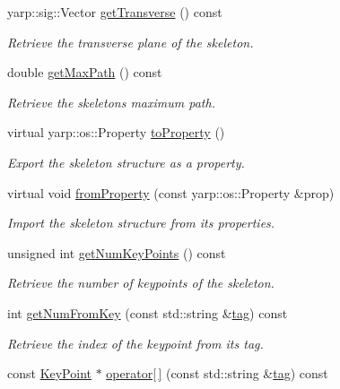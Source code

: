 \begin{DoxyCompactItemize}
yarp\+::sig\+::\+Vector \mbox{\hyperlink{classassistive__rehab_1_1Skeleton_a35c3cdea575eb474a2cb8e0186011cff}{get\+Transverse}} () const
\begin{DoxyCompactList}\small\item\em Retrieve the transverse plane of the skeleton. \end{DoxyCompactList}\item 
double \mbox{\hyperlink{classassistive__rehab_1_1Skeleton_acda9030cd2ed3ad92697418a5e2cff7c}{get\+Max\+Path}} () const
\begin{DoxyCompactList}\small\item\em Retrieve the skeleton\textquotesingle{}s maximum path. \end{DoxyCompactList}\item 
virtual yarp\+::os\+::\+Property \mbox{\hyperlink{classassistive__rehab_1_1Skeleton_ad58ea53a165abc3f39a3c46594f0560f}{to\+Property}} ()
\begin{DoxyCompactList}\small\item\em Export the skeleton structure as a property. \end{DoxyCompactList}\item 
virtual void \mbox{\hyperlink{classassistive__rehab_1_1Skeleton_ac844f66503de87859833056dc33a835b}{from\+Property}} (const yarp\+::os\+::\+Property \&prop)
\begin{DoxyCompactList}\small\item\em Import the skeleton structure from its properties. \end{DoxyCompactList}\item 
unsigned int \mbox{\hyperlink{classassistive__rehab_1_1Skeleton_ac5e5b98f2c9178f6e0def5033e27922f}{get\+Num\+Key\+Points}} () const
\begin{DoxyCompactList}\small\item\em Retrieve the number of keypoints of the skeleton. \end{DoxyCompactList}\item 
int \mbox{\hyperlink{classassistive__rehab_1_1Skeleton_a954bfa99e0dad997ca6d93495246d3f1}{get\+Num\+From\+Key}} (const std\+::string \&\mbox{\hyperlink{classassistive__rehab_1_1Skeleton_a3d1ce5280300e012826948dc4383c2cb}{tag}}) const
\begin{DoxyCompactList}\small\item\em Retrieve the index of the keypoint from its tag. \end{DoxyCompactList}\item 
const \mbox{\hyperlink{classassistive__rehab_1_1KeyPoint}{Key\+Point}} $\ast$ \mbox{\hyperlink{classassistive__rehab_1_1Skeleton_a3ecc7418af653c88e40d41bb379b7271}{operator\mbox{[}$\,$\mbox{]}}} (const std\+::string \&\mbox{\hyperlink{classassistive__rehab_1_1Skeleton_a3d1ce5280300e012826948dc4383c2cb}{tag}}) const

\end{DoxyCompactItemize}

